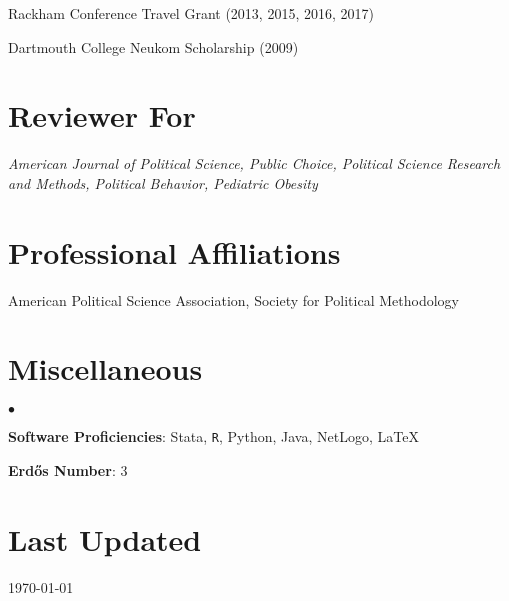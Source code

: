 \documentclass[margin,line]{res}
\newenvironment{list2}{
  \begin{list}{$\bullet$}{%
      \setlength{\itemsep}{0in}
      \setlength{\parsep}{0in} \setlength{\parskip}{0in}
      \setlength{\topsep}{0in} \setlength{\partopsep}{0in} 
      \setlength{\leftmargin}{0.2in}}}{\end{list}}
\begin{document}
\begin{resume}
Rackham Conference Travel Grant (2013, 2015, 2016, 2017)

Dartmouth College Neukom Scholarship (2009)



\section{\sc Reviewer For}
\textit{American Journal of Political Science, Public Choice, Political Science Research and Methods, Political Behavior, Pediatric Obesity}

\section{\sc Professional Affiliations}
American Political Science Association, Society for Political Methodology





\section{\sc Miscellaneous}
\begin{list2}
	\item \textbf{Software Proficiencies}: Stata, {\tt R}, Python, Java, NetLogo, \LaTeX
	\item \textbf{Erd{\H o}s Number}: 3
\end{list2}


\section{\sc Last Updated}
\today

%

\end{resume}
\end{document}
